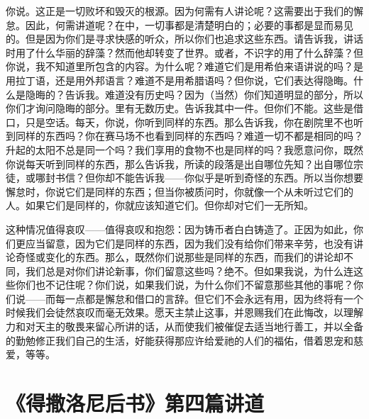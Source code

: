 你说。这正是一切败坏和毁灭的根源。因为何需有人讲论呢？这需要出于我们的懈怠。因此，何需讲道呢？在中，一切事都是清楚明白的；必要的事都是显而易见的。但是因为你们是寻求快感的听众，所以你们也追求这些东西。请告诉我，讲话时用了什么华丽的辞藻？然而他却转变了世界。或者，不识字的用了什么辞藻？但你说，我不知道里所包含的内容。为什么呢？难道它们是用希伯来语讲说的吗？是用拉丁语，还是用外邦语言？难道不是用希腊语吗？但你说，它们表达得隐晦。什么是隐晦的？告诉我。难道没有历史吗？因为（当然）你们知道明显的部分，所以你们才询问隐晦的部分。里有无数历史。告诉我其中一件。但你们不能。这些是借口，只是空话。每天，你说，你听到同样的东西。那么告诉我，你在剧院里不也听到同样的东西吗？你在赛马场不也看到同样的东西吗？难道一切不都是相同的吗？升起的太阳不总是同一个吗？我们享用的食物不也是同样的吗？我愿意问你，既然你说每天听到同样的东西，那么告诉我，所读的段落是出自哪位先知？出自哪位宗徒，或哪封书信？但你却不能告诉我——你似乎是听到奇怪的东西。所以当你想要懈怠时，你说它们是同样的东西；但当你被质问时，你就像一个从未听过它们的人。如果它们是同样的，你就应该知道它们。但你却对它们一无所知。\par

这种情况值得哀叹——值得哀叹和抱怨：因为铸币者白白铸造了。正因为如此，你们更应当留意，因为它们是同样的东西，因为我们没有给你们带来辛劳，也没有讲论奇怪或变化的东西。那么，既然你们说那些是同样的东西，而我们的讲论却不同，我们总是对你们讲论新事，你们留意这些吗？绝不。但如果我说，为什么连这些你们也不记住呢？你们说，如果我们说，为什么你们不留意那些其他的事呢？你们说——而每一点都是懈怠和借口的言辞。但它们不会永远有用，因为终将有一个时候我们会徒然哀叹而毫无效果。愿天主禁止这事，并恩赐我们在此悔改，以理解力和对天主的敬畏来留心所讲的话，从而使我们被催促去适当地行善工，并以全备的勤勉修正我们自己的生活，好能获得那应许给爱祂的人们的福佑，借着恩宠和慈爱，等等。\par



\section{《得撒洛尼后书》第四篇讲道}


